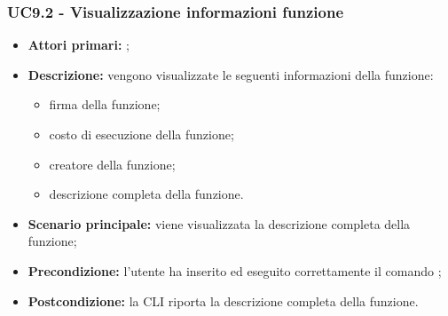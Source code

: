 \subsubsection{UC9.2 - Visualizzazione informazioni funzione}
\begin{itemize}
	\item \textbf{Attori primari:} \ua{};
	\item \textbf{Descrizione:} vengono visualizzate le seguenti informazioni della funzione:
	\begin{itemize}
		\item firma della funzione;
		\item costo di esecuzione della funzione; 
		\item creatore della funzione; 
		\item descrizione completa della funzione.
	\end{itemize} 
	\item \textbf{Scenario principale:} viene visualizzata la descrizione completa della funzione;
	\item \textbf{Precondizione:} l’utente ha inserito ed eseguito correttamente il comando \pinfo{}; 
	\item \textbf{Postcondizione:} la CLI riporta la descrizione completa della funzione.
\end{itemize}
